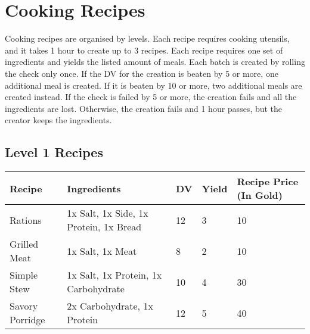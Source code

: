 \section{Cooking Recipes}\label{sec:cookingRecipes}
Cooking recipes are organised by levels.
Each recipe requires cooking utensils, and it takes 1 hour to create up to 3 recipes.
Each recipe requires one set of ingredients and yields the listed amount of meals.
Each batch is created by rolling the check only once.
If the DV for the creation is beaten by 5 or more, one additional meal is created.
If it is beaten by 10 or more, two additional meals are created instead.
If the check is failed by 5 or more, the creation fails and all the ingredients are lost.
Otherwise, the creation fails and 1 hour passes, but the creator keeps the ingredients.\\


\subsection{Level 1 Recipes}
\begin{longtable}{l | p{2.5cm} | l | p{1cm} | p{1cm} }
	Recipe & Ingredients & DV & Yield & Recipe Price (In Gold)\\ \hline
	Rations & 1x Salt, 1x Side, 1x Protein, 1x Bread & 12 & 3 & 10\\
	Grilled Meat & 1x Salt, 1x Meat & 8 & 2 & 10\\
	Simple Stew & 1x Salt, 1x Protein, 1x Carbohydrate & 10 & 4 & 30\\
	Savory Porridge & 2x Carbohydrate, 1x Protein & 12 & 5 & 40\\
\end{longtable}